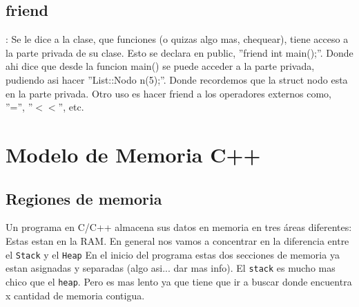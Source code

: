 \documentclass[11pt]{article}
\begin{document}
\vspace{0.5cm}
\subsection{friend}: Se le dice a la clase, que funciones (o quizas algo mas, chequear),
tiene  acceso a la parte privada de su clase.
Esto se declara en public, ''friend int main();''.
Donde ahi dice que desde la funcion main() se puede acceder a la parte privada,
pudiendo asi hacer ''List::Nodo n(5);''.
Donde recordemos que la struct nodo esta en la parte privada.
Otro uso es hacer friend a los operadores externos como, ''='', ''$<<$'', etc.




\section{Modelo de Memoria C++}


\subsection{Regiones de memoria}
Un programa en C/C++ almacena sus datos en memoria en tres áreas diferentes:
Estas estan en la RAM.
En general nos vamos a concentrar en la diferencia entre el \texttt{Stack} y el \texttt{Heap}
En el inicio del programa estas dos secciones de memoria ya estan asignadas y
separadas (algo asi... dar mas info).
El \texttt{stack} es mucho mas chico que el \texttt{heap}.
Pero es mas lento ya que tiene que ir a buscar donde encuentra x cantidad de
memoria contigua.
\end{document}
